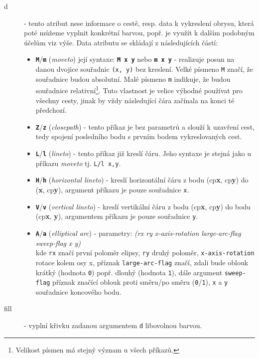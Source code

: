 \begin{description}
	\item[d]  - tento atribut nese informace o cestě, resp. data k vykreslení obrysu, která poté můžeme vyplnit konkrétní barvou, popř. je využít k dalším podobným účelům viz výše. Data atributu se skládají z následujících částí:
	
	\begin{itemize}
		\item \texttt{\textbf{M}}/\texttt{\textbf{m}} (\textit{moveto}) její syntaxe: \texttt{\textbf{M x y}} nebo \texttt{\textbf{m x y}} - realizuje posun na danou dvojice souřadnic \texttt{(x, y)} bez kreslení. Velké písmeno \texttt{M} značí, že souřadnice budou absolutní. Malé písmeno \texttt{m} indikuje, že budou souřadnice relativní\footnote{Velikost písmen má stejný význam u všech příkazů.}. Tuto vlastnost je velice výhodné používat pro všechny cesty, jinak by vždy následující čára začínala na konci té předchozí.\\
		
		\item \texttt{\textbf{Z}}/\texttt{\textbf{z}} (\textit{closepath}) - tento příkaz je bez parametrů a slouží k uzavření cest, tedy spojení posledního bodu s prvním bodem vykreslovaných cest.\\
		
		\item \texttt{\textbf{L}}/\texttt{\textbf{l}} (\textit{lineto}) - tento příkaz již kreslí čáru. Jeho syntaxe je  stejná jako u příkazu \textit{moveto} tj. \texttt{L/l x,y}.\\
		
		\item \texttt{\textbf{H}}/\texttt{\textbf{h}} (\textit{horizontal lineto}) - kreslí horizontální čáru z bodu (cp\textbf{x}, cp\textbf{y}) do (\textbf{x}, cp\textbf{y}), argument příkazu je pouze souřadnice \texttt{x}.\\
		
		\item \texttt{\textbf{V}}/\texttt{\textbf{v}} (\textit{vertical lineto}) - kreslí vertikální čáru z bodu (cp\textbf{x}, cp\textbf{y}) do bodu (cp\textbf{x}, \textbf{y}), argumentem příkazu je pouze souřadnice \texttt{y}.\\
		
		\item \texttt{\textbf{A}}/\texttt{\textbf{a}} (\textit{elliptical arc}) - parametry:  \textit{{\small (rx ry x-axis-rotation large-arc-flag sweep-flag x y)}} \\ kde \texttt{rx} značí první poloměr elipsy, \texttt{ry} druhý poloměr, \texttt{x-axis-rotation} rotace kolem osy x, příznak \texttt{large-arc-flag} značí, zdali bude oblouk krátký (hodnota \texttt{0}) popř. dlouhý (hodnota \texttt{1}), dále argument \texttt{sweep-flag} příznak značící oblouk proti směru/po směru (\texttt{0}/\texttt{1}), \texttt{x} a \texttt{y} souřadnice koncového bodu.
	\end{itemize}


	\item[fill]  - vyplní křivku zadanou argumentem \texttt{d} libovolnou barvou.
\end{description}





